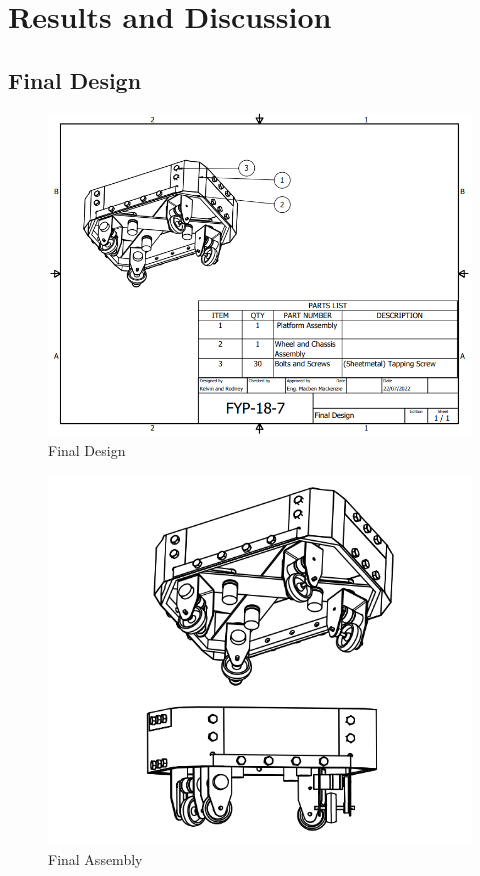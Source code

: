\chapter{Results and Discussion}
\section{Final Design}

\begin{figure}[h]
    \centering
    \includegraphics[scale = 0.7]{Figures/NewFinalAssemblyParts.png}
    \caption{Final Design}
    \label{fig:finalassemblyparts}
\end{figure}

\begin{figure}[h]
    \centering
    \includegraphics[scale = 0.8]{Figures/NewFinalDesignDWG.png}
    \caption{Final Assembly}
    \label{fig:finalassembly}
\end{figure}

